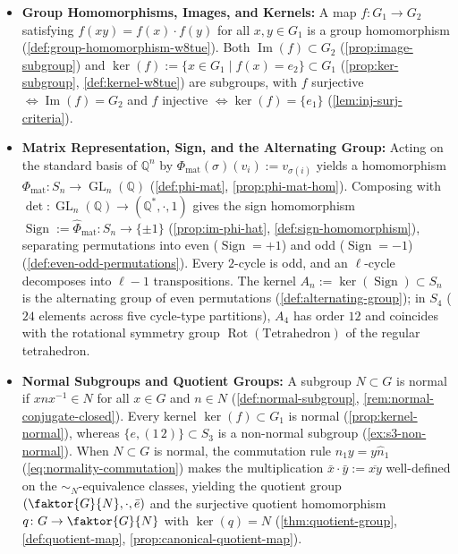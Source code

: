 \begin{overview}
\begin{itemize}
    \item \textbf{Group Homomorphisms, Images, and Kernels:} A map $f \colon G_1 \to G_2$ satisfying $f(xy) = f(x) \cdot f(y)$ for all $x, y \in G_1$ is a group homomorphism (\cref{def:group-homomorphism-w8tue}). Both $\operatorname{Im}(f) \subset G_2$ (\cref{prop:image-subgroup}) and $\ker(f) := \{x \in G_1 \mid f(x) = e_2\} \subset G_1$ (\cref{prop:ker-subgroup}, \cref{def:kernel-w8tue}) are subgroups, with $f$ surjective $\iff \operatorname{Im}(f) = G_2$ and $f$ injective $\iff \ker(f) = \{e_1\}$ (\cref{lem:inj-surj-criteria}).
    \item \textbf{Matrix Representation, Sign, and the Alternating Group:} Acting on the standard basis of $\mathbb{Q}^n$ by $\Phi_{\text{mat}}(\sigma)(v_i) := v_{\sigma(i)}$ yields a homomorphism $\Phi_{\text{mat}} \colon S_n \to \operatorname{GL}_n(\mathbb{Q})$ (\cref{def:phi-mat}, \cref{prop:phi-mat-hom}). Composing with $\det \colon \operatorname{GL}_n(\mathbb{Q}) \to (\mathbb{Q}^*, \cdot, 1)$ gives the sign homomorphism $\operatorname{Sign} := \hat{\Phi}_{\text{mat}} \colon S_n \to \{\pm 1\}$ (\cref{prop:im-phi-hat}, \cref{def:sign-homomorphism}), separating permutations into even ($\operatorname{Sign} = +1$) and odd ($\operatorname{Sign} = -1$) (\cref{def:even-odd-permutations}). Every $2$-cycle is odd, and an $\ell$-cycle decomposes into $\ell - 1$ transpositions. The kernel $A_n := \ker(\operatorname{Sign}) \subset S_n$ is the alternating group of even permutations (\cref{def:alternating-group}); in $S_4$ ($24$ elements across five cycle-type partitions), $A_4$ has order $12$ and coincides with the rotational symmetry group $\operatorname{Rot}(\text{Tetrahedron})$ of the regular tetrahedron.
    \item \textbf{Normal Subgroups and Quotient Groups:} A subgroup $N \subset G$ is normal if $x n x^{-1} \in N$ for all $x \in G$ and $n \in N$ (\cref{def:normal-subgroup}, \cref{rem:normal-conjugate-closed}). Every kernel $\ker(f) \subset G_1$ is normal (\cref{prop:kernel-normal}), whereas $\{e, (1\,2)\} \subset S_3$ is a non-normal subgroup (\cref{ex:s3-non-normal}). When $N \subset G$ is normal, the commutation rule $n_1 y = y \hat{n}_1$ (\eqref{eq:normality-commutation}) makes the multiplication $\bar{x} \cdot \bar{y} := \overline{xy}$ well-defined on the $\sim_N$-equivalence classes, yielding the quotient group $(\faktor{G}{N}, \cdot, \bar{e})$ and the surjective quotient homomorphism $q \colon G \to \faktor{G}{N}$ with $\ker(q) = N$ (\cref{thm:quotient-group}, \cref{def:quotient-map}, \cref{prop:canonical-quotient-map}).

\end{itemize}
\end{overview}
